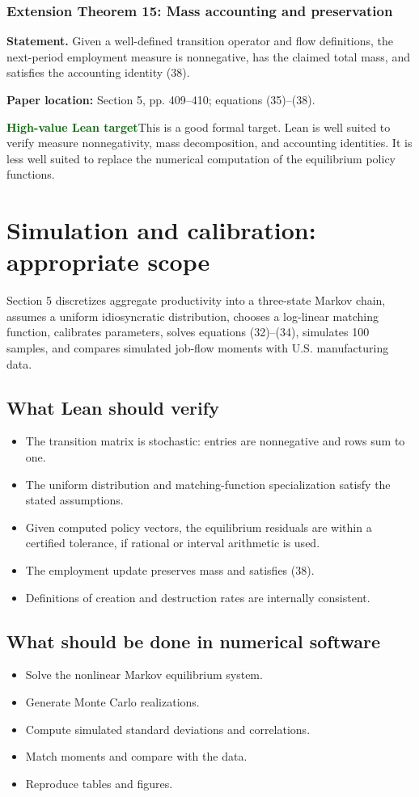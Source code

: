 \documentclass[11pt]{article}
\newcommand{\leanhigh}{\textcolor{darkgreen}{\textbf{High-value Lean target}}}
\newcommand{\papersec}[1]{\textbf{Paper location:} #1}
\newcommand{\statusbox}[2]{\colorbox{#1}{\parbox{0.94\linewidth}{#2}}}
\begin{document}
\subsubsection*{Extension Theorem 15: Mass accounting and preservation}
\textbf{Statement.} Given a well-defined transition operator and flow definitions, the next-period employment measure is nonnegative, has the claimed total mass, and satisfies the accounting identity (38).

\papersec{Section 5, pp. 409--410; equations (35)--(38).}

\statusbox{softgreen}{\leanhigh\quad This is a good formal target. Lean is well suited to verify measure nonnegativity, mass decomposition, and accounting identities. It is less well suited to replace the numerical computation of the equilibrium policy functions.}

\section{Simulation and calibration: appropriate scope}

Section 5 discretizes aggregate productivity into a three-state Markov chain, assumes a uniform idiosyncratic distribution, chooses a log-linear matching function, calibrates parameters, solves equations (32)--(34), simulates 100 samples, and compares simulated job-flow moments with U.S. manufacturing data.

\subsection{What Lean should verify}
\begin{itemize}
\item The transition matrix is stochastic: entries are nonnegative and rows sum to one.
\item The uniform distribution and matching-function specialization satisfy the stated assumptions.
\item Given computed policy vectors, the equilibrium residuals are within a certified tolerance, if rational or interval arithmetic is used.
\item The employment update preserves mass and satisfies (38).
\item Definitions of creation and destruction rates are internally consistent.
\end{itemize}

\subsection{What should be done in numerical software}
\begin{itemize}
\item Solve the nonlinear Markov equilibrium system.
\item Generate Monte Carlo realizations.
\item Compute simulated standard deviations and correlations.
\item Match moments and compare with the data.
\item Reproduce tables and figures.
\end{itemize}
\end{document}
